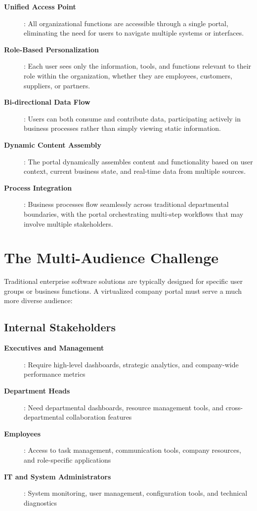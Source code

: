 \begin{description}
\item[\textbf{Unified Access Point}]: All organizational functions are accessible through a single portal, eliminating the need for users to navigate multiple systems or interfaces.

\item[\textbf{Role-Based Personalization}]: Each user sees only the information, tools, and functions relevant to their role within the organization, whether they are employees, customers, suppliers, or partners.

\item[\textbf{Bi-directional Data Flow}]: Users can both consume and contribute data, participating actively in business processes rather than simply viewing static information.

\item[\textbf{Dynamic Content Assembly}]: The portal dynamically assembles content and functionality based on user context, current business state, and real-time data from multiple sources.

\item[\textbf{Process Integration}]: Business processes flow seamlessly across traditional departmental boundaries, with the portal orchestrating multi-step workflows that may involve multiple stakeholders.
\end{description}

\section{The Multi-Audience Challenge}
\label{sec:multi-audience}

Traditional enterprise software solutions are typically designed for specific user groups or business functions. A virtualized company portal must serve a much more diverse audience:

\subsection{Internal Stakeholders}

\begin{description}
\item[\textbf{Executives and Management}]: Require high-level dashboards, strategic analytics, and company-wide performance metrics
\item[\textbf{Department Heads}]: Need departmental dashboards, resource management tools, and cross-departmental collaboration features
\item[\textbf{Employees}]: Access to task management, communication tools, company resources, and role-specific applications
\item[\textbf{IT and System Administrators}]: System monitoring, user management, configuration tools, and technical diagnostics
\end{description}

